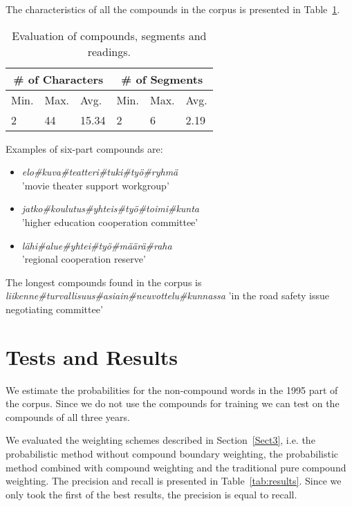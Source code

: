 \documentclass[postprint]{flammie}
\begin{document}
The characteristics of all the compounds in the corpus is presented in
Table~\ref{tab:compounds}.

\begin{table}[htb!]
  \begin{small}
    \begin{tabular}{|l|l|l|l|l|l|}
      \hline
      \multicolumn{3}{c}{\# of Characters} & \multicolumn{3}{c}{\# of Segments} \\
      \hline 
      Min. &  Max. &  Avg. & Min. & Max. & Avg. \\
      \hline 
      2 & 44 & 15.34 & 2 & 6 & 2.19 \\
      \hline
    \end{tabular}
    \caption{Evaluation of compounds, segments and readings.
    }\label{tab:compounds}
  \end{small}
\end{table}

Examples of six-part compounds are:
\begin{itemize}
\item \emph{elo\#kuva\#teat\-teri\#tuki\#työ\#ryhmä} \\
'movie theater support workgroup' 
\item \emph{jatko\#koulu\-tus\#yhteis\#työ\#toimi\#kunta} \\
'higher education cooperation committee'
\item \emph{lähi\#alue\#yhtei\#työ\#määrä\#raha} \\
'regional cooperation reserve'
\end{itemize}

The longest compounds found in the corpus is
\emph{liiken\-ne\#turval\-lisuus\#asiain\#neuvot\-telu\#kunnassa} 'in the road
safety issue negotiating committee'

\section{Tests and  Results}
\label{Sect5}

We estimate the probabilities for the non-compound words in the 1995
part of the corpus. Since we do not use the compounds for training we
can test on the compounds of all three years.

We evaluated the weighting schemes described in Section~\ref{Sect3},
i.e. the probabilistic method without compound boundary weighting, the
probabilistic method combined with compound weighting and the
traditional pure compound weighting. The precision and recall is
presented in Table~\ref{tab:results}. Since we only took the first of
the best results, the precision is equal to recall.
\end{document}
